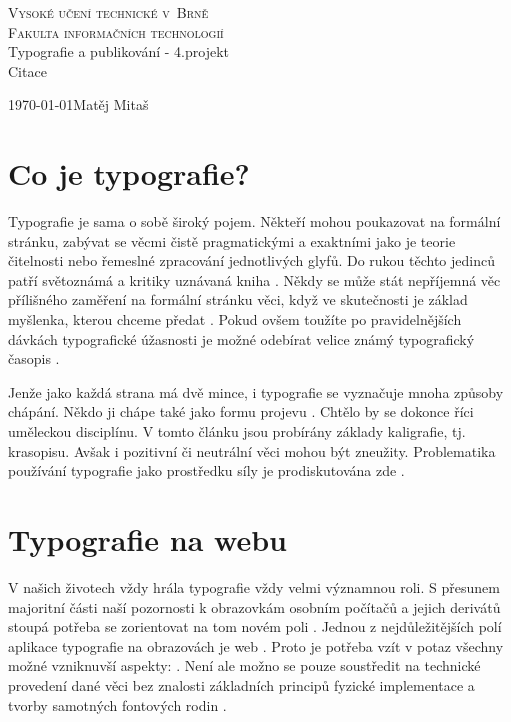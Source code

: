 \documentclass[11pt]{article}
\begin{document}
\begin{titlepage}
	\begin{center}
    	\Huge
		\textsc{\Huge{Vysoké učení technické v~Brně}\\ \huge{Fakulta informačních technologií}} \\
		\LARGE Typografie a publikování - 4.projekt\\
		\Huge{Citace}
	\end{center}
	{\Large \today \hfill Matěj Mitaš}
\end{titlepage}

\section*{Co je typografie?}

Typografie je sama o sobě široký pojem. Někteří mohou poukazovat na formální stránku, zabývat se věcmi čistě pragmatickými a exaktními jako je teorie čitelnosti nebo řemeslné zpracování jednotlivých glyfů. Do rukou těchto jedinců patří světoznámá a kritiky uznávaná kniha \emph{}\cite{kniha_1}. Někdy se může stát nepříjemná věc přílišného zaměření na formální stránku věci, když ve skutečnosti je základ myšlenka, kterou chceme předat \cite{mag_clanek_2}. Pokud ovšem toužíte po pravidelnějších dávkách typografické úžasnosti je možné odebírat velice známý typografický časopis \emph{} \cite{magazin}.

Jenže jako každá strana má dvě mince, i typografie se vyznačuje mnoha způsoby chápání. Někdo ji chápe také jako formu projevu \cite{prace_1}. Chtělo by se dokonce říci uměleckou disciplínu. V tomto článku \cite{online_3} jsou probírány základy kaligrafie, tj. krasopisu. Avšak i pozitivní či neutrální věci mohou být zneužity. Problematika používání typografie jako prostředku síly je prodiskutována zde \cite{mag_clanek_1}.

\section*{Typografie na webu}

V našich životech vždy hrála typografie vždy velmi významnou roli. S přesunem majoritní části naší pozornosti k obrazovkám osobním počítačů a jejich derivátů stoupá potřeba se zorientovat na tom novém poli \cite{kniha_2}. Jednou z nejdůležitějších polí aplikace typografie na obrazovách je web \cite{online_2} . Proto je potřeba vzít v potaz všechny možné vzniknuvší aspekty: \emph{} \cite{online_1}. Není ale možno se pouze soustředit na technické provedení dané věci bez znalosti základních principů fyzické implementace a tvorby samotných fontových rodin \cite{prace_2}.


\newpage




\end{document}
